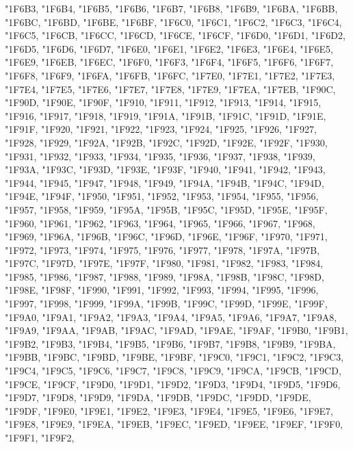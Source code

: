 {	"1F6B3,
	"1F6B4,
	"1F6B5,
	"1F6B6,
	"1F6B7,
	"1F6B8,
	"1F6B9,
	"1F6BA,
	"1F6BB,
	"1F6BC,
	"1F6BD,
	"1F6BE,
	"1F6BF,
	"1F6C0,
	"1F6C1,
	"1F6C2,
	"1F6C3,
	"1F6C4,
	"1F6C5,
	"1F6CB,
	"1F6CC,
	"1F6CD,
	"1F6CE,
	"1F6CF,
	"1F6D0,
	"1F6D1,
	"1F6D2,
	"1F6D5,
	"1F6D6,
	"1F6D7,
	"1F6E0,
	"1F6E1,
	"1F6E2,
	"1F6E3,
	"1F6E4,
	"1F6E5,
	"1F6E9,
	"1F6EB,
	"1F6EC,
	"1F6F0,
	"1F6F3,
	"1F6F4,
	"1F6F5,
	"1F6F6,
	"1F6F7,
	"1F6F8,
	"1F6F9,
	"1F6FA,
	"1F6FB,
	"1F6FC,
	"1F7E0,
	"1F7E1,
	"1F7E2,
	"1F7E3,
	"1F7E4,
	"1F7E5,
	"1F7E6,
	"1F7E7,
	"1F7E8,
	"1F7E9,
	"1F7EA,
	"1F7EB,
	"1F90C,
	"1F90D,
	"1F90E,
	"1F90F,
	"1F910,
	"1F911,
	"1F912,
	"1F913,
	"1F914,
	"1F915,
	"1F916,
	"1F917,
	"1F918,
	"1F919,
	"1F91A,
	"1F91B,
	"1F91C,
	"1F91D,
	"1F91E,
	"1F91F,
	"1F920,
	"1F921,
	"1F922,
	"1F923,
	"1F924,
	"1F925,
	"1F926,
	"1F927,
	"1F928,
	"1F929,
	"1F92A,
	"1F92B,
	"1F92C,
	"1F92D,
	"1F92E,
	"1F92F,
	"1F930,
	"1F931,
	"1F932,
	"1F933,
	"1F934,
	"1F935,
	"1F936,
	"1F937,
	"1F938,
	"1F939,
	"1F93A,
	"1F93C,
	"1F93D,
	"1F93E,
	"1F93F,
	"1F940,
	"1F941,
	"1F942,
	"1F943,
	"1F944,
	"1F945,
	"1F947,
	"1F948,
	"1F949,
	"1F94A,
	"1F94B,
	"1F94C,
	"1F94D,
	"1F94E,
	"1F94F,
	"1F950,
	"1F951,
	"1F952,
	"1F953,
	"1F954,
	"1F955,
	"1F956,
	"1F957,
	"1F958,
	"1F959,
	"1F95A,
	"1F95B,
	"1F95C,
	"1F95D,
	"1F95E,
	"1F95F,
	"1F960,
	"1F961,
	"1F962,
	"1F963,
	"1F964,
	"1F965,
	"1F966,
	"1F967,
	"1F968,
	"1F969,
	"1F96A,
	"1F96B,
	"1F96C,
	"1F96D,
	"1F96E,
	"1F96F,
	"1F970,
	"1F971,
	"1F972,
	"1F973,
	"1F974,
	"1F975,
	"1F976,
	"1F977,
	"1F978,
	"1F97A,
	"1F97B,
	"1F97C,
	"1F97D,
	"1F97E,
	"1F97F,
	"1F980,
	"1F981,
	"1F982,
	"1F983,
	"1F984,
	"1F985,
	"1F986,
	"1F987,
	"1F988,
	"1F989,
	"1F98A,
	"1F98B,
	"1F98C,
	"1F98D,
	"1F98E,
	"1F98F,
	"1F990,
	"1F991,
	"1F992,
	"1F993,
	"1F994,
	"1F995,
	"1F996,
	"1F997,
	"1F998,
	"1F999,
	"1F99A,
	"1F99B,
	"1F99C,
	"1F99D,
	"1F99E,
	"1F99F,
	"1F9A0,
	"1F9A1,
	"1F9A2,
	"1F9A3,
	"1F9A4,
	"1F9A5,
	"1F9A6,
	"1F9A7,
	"1F9A8,
	"1F9A9,
	"1F9AA,
	"1F9AB,
	"1F9AC,
	"1F9AD,
	"1F9AE,
	"1F9AF,
	"1F9B0,
	"1F9B1,
	"1F9B2,
	"1F9B3,
	"1F9B4,
	"1F9B5,
	"1F9B6,
	"1F9B7,
	"1F9B8,
	"1F9B9,
	"1F9BA,
	"1F9BB,
	"1F9BC,
	"1F9BD,
	"1F9BE,
	"1F9BF,
	"1F9C0,
	"1F9C1,
	"1F9C2,
	"1F9C3,
	"1F9C4,
	"1F9C5,
	"1F9C6,
	"1F9C7,
	"1F9C8,
	"1F9C9,
	"1F9CA,
	"1F9CB,
	"1F9CD,
	"1F9CE,
	"1F9CF,
	"1F9D0,
	"1F9D1,
	"1F9D2,
	"1F9D3,
	"1F9D4,
	"1F9D5,
	"1F9D6,
	"1F9D7,
	"1F9D8,
	"1F9D9,
	"1F9DA,
	"1F9DB,
	"1F9DC,
	"1F9DD,
	"1F9DE,
	"1F9DF,
	"1F9E0,
	"1F9E1,
	"1F9E2,
	"1F9E3,
	"1F9E4,
	"1F9E5,
	"1F9E6,
	"1F9E7,
	"1F9E8,
	"1F9E9,
	"1F9EA,
	"1F9EB,
	"1F9EC,
	"1F9ED,
	"1F9EE,
	"1F9EF,
	"1F9F0,
	"1F9F1,
	"1F9F2,
}
